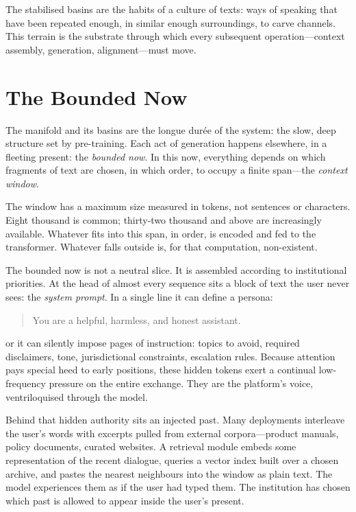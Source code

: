 \documentclass[12pt,a4paper]{article}
\begin{document}
The stabilised basins are the habits of a culture of texts: ways of speaking that have been repeated enough, in similar enough surroundings, to carve channels. This terrain is the substrate through which every subsequent operation---context assembly, generation, alignment---must move.

\section{The Bounded Now}

The manifold and its basins are the longue dur\'ee of the system: the slow, deep structure set by pre-training. Each act of generation happens elsewhere, in a fleeting present: the \emph{bounded now}. In this now, everything depends on which fragments of text are chosen, in which order, to occupy a finite span---the \emph{context window}.

The window has a maximum size measured in tokens, not sentences or characters. Eight thousand is common; thirty-two thousand and above are increasingly available. Whatever fits into this span, in order, is encoded and fed to the transformer. Whatever falls outside is, for that computation, non-existent.

The bounded now is not a neutral slice. It is assembled according to institutional priorities. At the head of almost every sequence sits a block of text the user never sees: the \emph{system prompt}. In a single line it can define a persona:

\begin{quote}
You are a helpful, harmless, and honest assistant.
\end{quote}

\noindent or it can silently impose pages of instruction: topics to avoid, required disclaimers, tone, jurisdictional constraints, escalation rules. Because attention pays special heed to early positions, these hidden tokens exert a continual low-frequency pressure on the entire exchange. They are the platform's voice, ventriloquised through the model.

Behind that hidden authority sits an injected past. Many deployments interleave the user's words with excerpts pulled from external corpora---product manuals, policy documents, curated websites. A retrieval module embeds some representation of the recent dialogue, queries a vector index built over a chosen archive, and pastes the nearest neighbours into the window as plain text. The model experiences them as if the user had typed them. The institution has chosen which past is allowed to appear inside the user's present.
\end{document}
